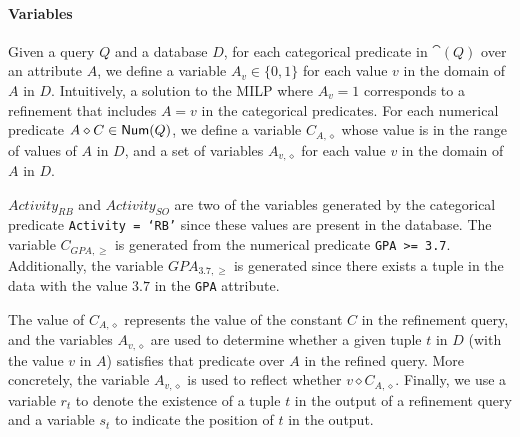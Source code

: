\paragraph*{\textbf{Variables}} Given a query $Q$ and a database $D$, for each categorical predicate in $\cat(Q)$ over an attribute $A$, we define a variable $A_{v} \in \{0, 1\}$ for each value $v$ in the domain of $A$ in $D$. Intuitively, a solution to the MILP where $A_{v} = 1$ corresponds to a refinement that includes $A = v$ in the categorical predicates. For each numerical predicate $A \diamond C \in \textsf{Num}(Q)$, we define a variable $C_{A, \diamond}$ whose value is in the range of values of $A$ in $D$, and a set of variables $A_{v, \diamond}$ for each value $v$ in the domain of $A$ in $D$.

\begin{example}
$Activity_{RB}$ and $Activity_{SO}$ are two of the variables generated by the categorical predicate {\tt Activity = `RB'}
since these values are present in the database. 
The variable $C_{GPA, \geq}$ is generated from the numerical predicate {\tt GPA >= 3.7}. Additionally, the variable $GPA_{3.7, \geq}$ is generated since there exists a tuple in the data with the value $3.7$ in the {\tt GPA} attribute. 
\end{example} 

The value of $C_{A, \diamond}$ represents the value of the constant $C$ in the refinement query, and the variables $A_{v, \diamond}$ are used to determine whether a given tuple $t$ in $D$ (with the value $v$ in $A$) satisfies that predicate over $A$ in the refined query. More concretely, the variable $A_{v, \diamond}$ is used to reflect whether  $v \diamond C_{A, \diamond}$. Finally, we use a variable $r_t$ to denote the existence of a tuple $t$ in the output of a refinement query and a variable $s_t$ to indicate the position of $t$ in the output.



